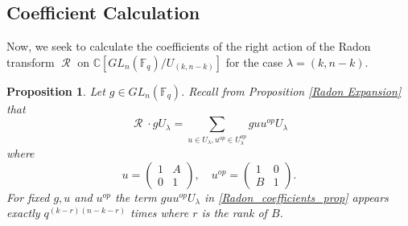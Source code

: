 \documentclass[12pt,reqno]{amsart}
\newtheorem{prop}[thm]{Proposition}
\theoremstyle{definition}
\theoremstyle{remark}
\numberwithin{equation}{section}
\newcommand{\CC}{\mathbb{C}}
\newcommand{\GL}[1]{GL_{#1}(\mathbb{F}_q)}
\DeclareMathOperator{\R}{\mathcal{R}}
\begin{document}

\subsection{Coefficient Calculation}

Now, we seek to calculate the coefficients of the right action of the Radon transform $\R$ on $\CC[\GL{n}/U_{(k,n-k)}]$ for the case $\lambda = (k,n-k)$.\\

\begin{prop}
    Let $g\in \GL{n}$. Recall from Proposition \ref{Radon Expansion} that
    \begin{equation}\label{Radon_coefficients_prop}
        \R\cdot gU_{\lambda} = \sum_{u\in U_{\lambda},u^{op}\in U_{\lambda}^{op}}guu^{op}U_{\lambda}
    \end{equation}
    where
    \[
    u=\begin{pmatrix}
        1 & A\\
        0 & 1
    \end{pmatrix},
    \quad u^{op}=\begin{pmatrix}
        1 & 0\\
        B & 1
    \end{pmatrix}.
    \]
    For fixed $g,u$ and $u^{op}$ the term $guu^{op}U_{\lambda}$ in \eqref{Radon_coefficients_prop} appears exactly $q^{(k-r)(n-k-r)}$ times where $r$ is the rank of $B$.
\end{prop}
\end{document}
